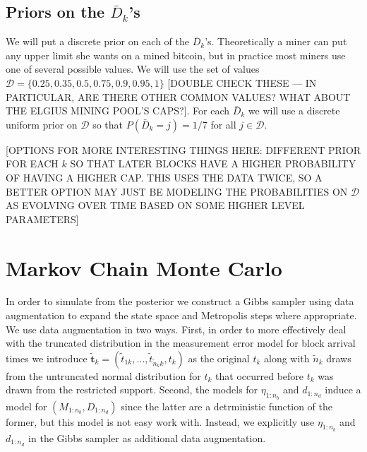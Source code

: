 \documentclass{article}
\begin{document}
\subsection{Priors on the $\bar{D}_k$'s}
We will put a discrete prior on each of the $\bar{D}_k$'s. Theoretically a miner can put any upper limit she wants on a mined bitcoin, but in practice most miners use one of several possible values. We will use the set of values $\mathcal{D} = \{0.25, 0.35, 0.5, 0.75, 0.9, 0.95, 1\}$ [DOUBLE CHECK THESE --- IN PARTICULAR, ARE THERE OTHER COMMON VALUES? WHAT ABOUT THE ELGIUS MINING POOL'S CAPS?]. For each $\bar{D}_k$ we will use a discrete uniform prior on $\mathcal{D}$ so that $P(\bar{D}_k = j) = 1/7$ for all $j \in \mathcal{D}$.

[OPTIONS FOR MORE INTERESTING THINGS HERE: DIFFERENT PRIOR FOR EACH $k$ SO THAT LATER BLOCKS HAVE A HIGHER PROBABILITY OF HAVING A HIGHER CAP. THIS USES THE DATA TWICE, SO A BETTER OPTION MAY JUST BE MODELING THE PROBABILITIES ON $\mathcal{D}$ AS EVOLVING OVER TIME BASED ON SOME HIGHER LEVEL PARAMETERS]

\section{Markov Chain Monte Carlo}\label{sec:mcmc}

In order to simulate from the posterior we construct a Gibbs sampler using data augmentation to expand the state space and Metropolis steps where appropriate. We use data augmentation in two ways. First, in order to more effectively deal with the truncated distribution in the measurement error model for block arrival times we introduce $\tilde{\bm{t}}_k=(\tilde{t}_{1k},\dots,\tilde{t}_{\tilde{n}_kk}, t_k)$ as the original $t_k$ along with $\tilde{n}_k$ draws from the untruncated normal distribution for $t_k$ that occurred before $t_k$ was drawn from the restricted support. Second, the models for $\eta_{1:n_{b}}$ and $d_{1:n_d}$ induce a model for $(M_{1:n_{b}},D_{1:n_d})$ since the latter are a detrministic function of the former, but this model is not easy work with. Instead, we explicitly use $\eta_{1:n_{b}}$ and $d_{1:n_d}$ in the Gibbs sampler as additional data augmentation.
\end{document}
